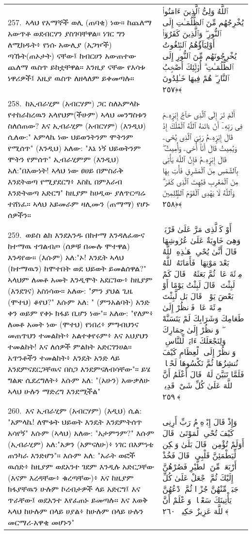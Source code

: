 \documentclass[11pt,a4paper,oneside]{article}%
\newcommand{\mytextarabic}[1]{\textarabic{ #1 \flushright}}
\begin{document}
\begin{longtable}{%
  @{}
    p{}
  @{~~~}
    p{}
    @{}
}
257.\ ኣላህ የአማኞች ወሊ (ጠባቂ) ነው። ከጨለማ አውጥቶ ወደብርሃን ያስገባቸዋል። ነገር ግን ለሚክዱት፥ የነሱ አውሊያ (አጋዦች) ጣኹት(ጠኦታት) ናቸው፤ ከብርሀን አውጠተው ጨለማ ዉስጥ ይከቷቸዋል። እንዚያ ናቸው የእሳቱ ነዋሪዎች፤ እዚያ ዉስጥ ለዘላለም ይቀመጣሉ። &  \mytextarabic{ٱللَّهُ وَلِىُّ ٱلَّذِينَ ءَامَنُوا۟ يُخْرِجُهُم مِّنَ ٱلظُّلُمَـٰتِ إِلَى ٱلنُّورِ ۖ وَٱلَّذِينَ كَفَرُوٓا۟ أَوْلِيَآؤُهُمُ ٱلطَّٟغُوتُ يُخْرِجُونَهُم مِّنَ ٱلنُّورِ إِلَى ٱلظُّلُمَـٰتِ ۗ أُو۟لَٟٓئِكَ أَصْحَٟبُ ٱلنَّارِ ۖ هُمْ فِيهَا خَـٰلِدُونَ ﴿٢٥٧﴾}\\
258.\ ከኢብራሂም (አብርሃም) ጋር ስለአምላኩ የተከራከረዉን አላየህም(ችሁም) ኣላህ መንግስቱን ስለሰጠው? እና ኢብራሂም (አብርሃም) (እንዲህ) ሲለው:" አምላኬ ነው ህይወንትንም ሞትንም የሚሰጥ" (እንዲህ) አለው: "እኔ ነኝ ህይወትንም ሞትን የምሰጥ" ኢብራሂምም (እንዲህ) አለ:"በእውነት! ኣላህ ነው ፀሀይ በምስራቅ እንደትወጣ የሚያደርግ፥ እስኪ በምእራብ እንድትወጣ አድርግ" ከዚያም ከሀዲው ያለጥርጣሬ ተሸነፈ። ኣላህ አይመራም ዛሊሙን (ጠማማ) የሆኑ ሰዎችን። &  \mytextarabic{ أَلَمْ تَرَ إِلَى ٱلَّذِى حَآجَّ إِبْرَٟهِۦمَ فِى رَبِّهِۦٓ أَنْ ءَاتَىٰهُ ٱللَّهُ ٱلْمُلْكَ إِذْ قَالَ إِبْرَٟهِۦمُ رَبِّىَ ٱلَّذِى يُحْىِۦ وَيُمِيتُ قَالَ أَنَا۠ أُحْىِۦ وَأُمِيتُ ۖ قَالَ إِبْرَٟهِۦمُ فَإِنَّ ٱللَّهَ يَأْتِى بِٱلشَّمْسِ مِنَ ٱلْمَشْرِقِ فَأْتِ بِهَا مِنَ ٱلْمَغْرِبِ فَبُهِتَ ٱلَّذِى كَفَرَ ۗ وَٱللَّهُ لَا يَهْدِى ٱلْقَوْمَ ٱلظَّٟلِمِينَ ﴿٢٥٨﴾}\\
259.\ ወይስ ልክ እንደአንዱ በከተማ እንዳለፈውና ከተማዉ ተገልብጦ (ሰዎቹ በሙሉ ሞተዋል) እንዳየው። (እሱም) አለ:"ኦ! እንዴት ኣላህ (ከተማዉን) ከሞተበት ወደ ህይወት ይመልሰዋል?" ኣላህም ለመቶ አመት እንዲሞት አደርገው፥ ከዚያም (እንደገና) አስነሳው። አለው: "ምን ያህል ጊዜ (ሞተህ) ቆየህ?" እሱም አለ: " (ምንአልባት) አንድ ቀን ወይም የቀኑ ክፋይ ቢሆን ነው"። አለው: "የለም፥ ለመቶ አመት ነው (ሞተህ) የነበረ፥ ምግብህንና መጠጥህን ተመልከት፥ አልተቀየሩም፥ እና አህያህን ተመልከት! እና ለሰዎች ምልክት አድርገንሀል። አጥንቶችን ተመልከት፥ እንዴት አንድ ላይ እንደምናደርጋቸዉና በስጋ እንደምናለብሳቸው"። ይሄ ግልጽ ሲደረግለት፥ እሱም አለ: "(አሁን) አውቃለሁ ኣላህ ሁሉን ማድረግ እንደሚችል" &  \mytextarabic{أَوْ كَٱلَّذِى مَرَّ عَلَىٰ قَرْيَةٍۢ وَهِىَ خَاوِيَةٌ عَلَىٰ عُرُوشِهَا قَالَ أَنَّىٰ يُحْىِۦ هَـٰذِهِ ٱللَّهُ بَعْدَ مَوْتِهَا ۖ فَأَمَاتَهُ ٱللَّهُ مِا۟ئَةَ عَامٍۢ ثُمَّ بَعَثَهُۥ ۖ قَالَ كَمْ لَبِثْتَ ۖ قَالَ لَبِثْتُ يَوْمًا أَوْ بَعْضَ يَوْمٍۢ ۖ قَالَ بَل لَّبِثْتَ مِا۟ئَةَ عَامٍۢ فَٱنظُرْ إِلَىٰ طَعَامِكَ وَشَرَابِكَ لَمْ يَتَسَنَّهْ ۖ وَٱنظُرْ إِلَىٰ حِمَارِكَ وَلِنَجْعَلَكَ ءَايَةًۭ لِّلنَّاسِ ۖ وَٱنظُرْ إِلَى ٱلْعِظَامِ كَيْفَ نُنشِزُهَا ثُمَّ نَكْسُوهَا لَحْمًۭا ۚ فَلَمَّا تَبَيَّنَ لَهُۥ قَالَ أَعْلَمُ أَنَّ ٱللَّهَ عَلَىٰ كُلِّ شَىْءٍۢ قَدِيرٌۭ ﴿٢٥٩﴾}\\
260.\ እና ኢብራሂም (አብርሃም) (እዲህ) ሲል: "አምላኬ! ለሞቱት ህይወት እንዴት እንደምትሰጥ አሳየኝ" እሱም (ኣላህ) አለው: "አታምንም?" እሱም (ኢብራሂም) አለ:"አዎን (አምናለሁ)፥ ነገር በእምነቴ ጠንካራ እንድሆን"። እሱም አለ: "አራት ወፎች ዉሰድ፥ ከዚያም ወደአንተ ገደም እንዲሉ አድርጋቸው (እናም እረዳቸው፥ ቁረጣቸው)፥ እና ከዚያም ክፋያቸዉን ሁሉም ኮረብታዎች ላይ አድርግ፤ እና ጥራቸው፤ ወደአንተ እየፈጠኑ ይመጣሉ። እና እወቅ ኣላህ ከሁሉም በላይ ሀያል፥ ከሁሉም በላይ ሁሉን መርማሪ-አዋቂ መሆኑን" &  \mytextarabic{وَإِذْ قَالَ إِبْرَٟهِۦمُ رَبِّ أَرِنِى كَيْفَ تُحْىِ ٱلْمَوْتَىٰ ۖ قَالَ أَوَلَمْ تُؤْمِن ۖ قَالَ بَلَىٰ وَلَٟكِن لِّيَطْمَئِنَّ قَلْبِى ۖ قَالَ فَخُذْ أَرْبَعَةًۭ مِّنَ ٱلطَّيْرِ فَصُرْهُنَّ إِلَيْكَ ثُمَّ ٱجْعَلْ عَلَىٰ كُلِّ جَبَلٍۢ مِّنْهُنَّ جُزْءًۭا ثُمَّ ٱدْعُهُنَّ يَأْتِينَكَ سَعْيًۭا ۚ وَٱعْلَمْ أَنَّ ٱللَّهَ عَزِيزٌ حَكِيمٌۭ ﴿٢٦٠﴾}\\

\end{longtable}
\end{document}
